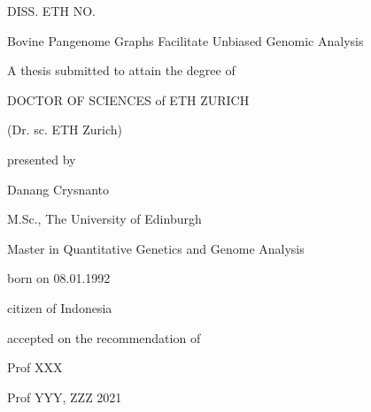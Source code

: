 \documentclass[../main.tex]{subfiles}
\begin{document}
\begin{center}
    \thispagestyle{empty}

    DISS. ETH NO.     

    \vspace{2cm}

    {\large Bovine Pangenome Graphs Facilitate Unbiased Genomic Analysis}

    \vspace{2cm}
    
    \doublespacing
    A thesis submitted to attain the degree of

    DOCTOR OF SCIENCES of ETH ZURICH

    (Dr. sc. ETH Zurich)
    \vspace{1cm}

    presented by

    \vspace{1cm}
    Danang Crysnanto  

    \vspace{1cm}

    M.Sc., The University of Edinburgh
    
    Master in Quantitative Genetics and Genome Analysis

    \vspace{1cm}

    born on 08.01.1992

    citizen of Indonesia

    \vspace{2cm}

    accepted on the recommendation of     

    Prof XXX 

    Prof YYY, ZZZ 
    \vspace{2cm}
    2021
\end{center}
\end{document}
